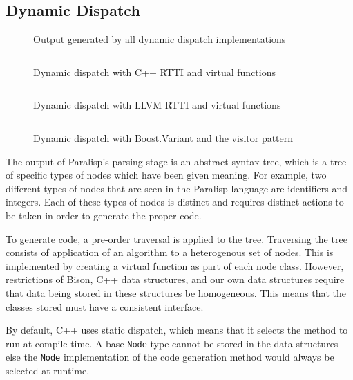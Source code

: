 \documentclass[abstracton]{scrartcl}
\begin{document}
\subsection{Dynamic Dispatch}
\label{sec:dyn-disp}

\begin{figure}
  \centering
  
  \caption{Output generated by all dynamic dispatch implementations}\label{fig:dyn-disp-out}
\end{figure}

\begin{figure}
  \centering
  \inputminted[fontsize=\scriptsize,tabsize=4]{cpp}{code/dyn-disp/cxx-rtti-virtual.cpp}
  \caption{Dynamic dispatch with C++ RTTI and virtual functions}\label{fig:dyn-disp-cxx}
\end{figure}

\begin{figure}
  \centering
  \inputminted[fontsize=\tiny,tabsize=4]{cpp}{code/dyn-disp/llvm-rtti-virtual.cpp}
  \caption{Dynamic dispatch with LLVM RTTI and virtual functions}\label{fig:dyn-disp-llvm}
\end{figure}

\begin{figure}
  \centering
  \inputminted[fontsize=\scriptsize,tabsize=4]{cpp}{code/dyn-disp/boost-variant-visitor.cpp}
  \caption{Dynamic dispatch with Boost.Variant and the visitor pattern}\label{fig:dyn-disp-boost}
\end{figure}

The output of Paralisp's parsing stage is an abstract syntax tree, which is a tree of specific types of nodes which have been given meaning. For example, two different types of nodes that are seen in the Paralisp language are identifiers and integers. Each of these types of nodes is distinct and requires distinct actions to be taken in order to generate the proper code.

To generate code, a pre-order traversal is applied to the tree. Traversing the tree consists of application of an algorithm to a heterogenous set of nodes. This is implemented by creating a virtual function as part of each node class. However, restrictions of Bison, C++ data structures, and our own data structures require that data being stored in these structures be homogeneous. This means that the classes stored must have a consistent interface.

By default, C++ uses static dispatch, which means that it selects the method to run at compile-time. A base \verb|Node| type cannot be stored in the data structures else the \verb|Node| implementation of the code generation method would always be selected at runtime.
\end{document}

